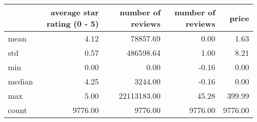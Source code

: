 \begin{tabular}{lrrrr}
\toprule
{} &  average star rating (0 - 5) &  number of reviews &  number of reviews &   price \\
\midrule
mean   & 4.12 & 78857.69 & 0.00 & 1.63 \\
std    & 0.57 & 486598.64 & 1.00 & 8.21 \\
min    & 0.00 & 0.00 & -0.16 & 0.00 \\
median & 4.25 & 3244.00 & -0.16 & 0.00 \\
max    & 5.00 & 22113183.00 & 45.28 & 399.99 \\
count  & 9776.00 & 9776.00 & 9776.00 & 9776.00 \\
\bottomrule
\end{tabular}
